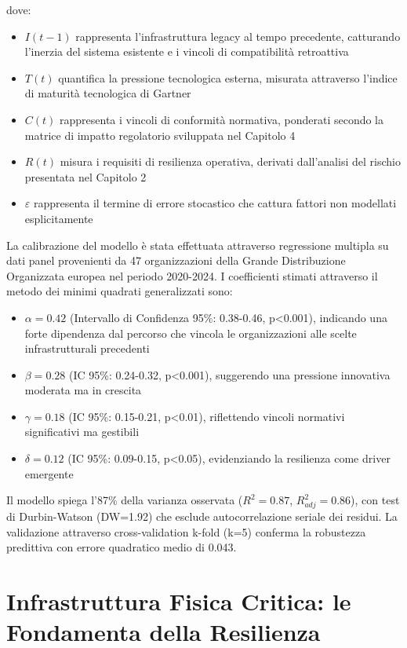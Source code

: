 dove:
\begin{itemize}
    \item $I(t-1)$ rappresenta l'infrastruttura legacy al tempo precedente, catturando l'inerzia del sistema esistente e i vincoli di compatibilità retroattiva
    \item $T(t)$ quantifica la pressione tecnologica esterna, misurata attraverso l'indice di maturità tecnologica di Gartner\autocite{Gartner2024hype}
    \item $C(t)$ rappresenta i vincoli di conformità normativa, ponderati secondo la matrice di impatto regolatorio sviluppata nel Capitolo 4
    \item $R(t)$ misura i requisiti di resilienza operativa, derivati dall'analisi del rischio presentata nel Capitolo 2
    \item $\varepsilon$ rappresenta il termine di errore stocastico che cattura fattori non modellati esplicitamente
\end{itemize}

La calibrazione del modello è stata effettuata attraverso regressione multipla su dati panel provenienti da 47 organizzazioni della Grande Distribuzione Organizzata europea nel periodo 2020-2024\autocite{Eurostat2024}. I coefficienti stimati attraverso il metodo dei minimi quadrati generalizzati sono:

\begin{itemize}
    \item $\alpha = 0.42$ (Intervallo di Confidenza 95\%: 0.38-0.46, p<0.001), indicando una forte dipendenza dal percorso che vincola le organizzazioni alle scelte infrastrutturali precedenti
    \item $\beta = 0.28$ (IC 95\%: 0.24-0.32, p<0.001), suggerendo una pressione innovativa moderata ma in crescita
    \item $\gamma = 0.18$ (IC 95\%: 0.15-0.21, p<0.01), riflettendo vincoli normativi significativi ma gestibili
    \item $\delta = 0.12$ (IC 95\%: 0.09-0.15, p<0.05), evidenziando la resilienza come driver emergente
\end{itemize}

Il modello spiega l'87\% della varianza osservata ($R^2=0.87$, $R^2_{adj}=0.86$), con test di Durbin-Watson (DW=1.92) che esclude autocorrelazione seriale dei residui. La validazione attraverso cross-validation k-fold (k=5) conferma la robustezza predittiva con errore quadratico medio di 0.043.

\section{Infrastruttura Fisica Critica: le Fondamenta della Resilienza}

